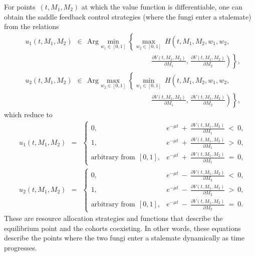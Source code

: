 \documentclass[11pt]{amsart}
\begin{document}
For points~$ (t, M_1, M_2) $ at which the value function is differentiable,
one can obtain the saddle feedback control strategies (where the fungi enter a stalemate) from the relations
$$
\begin{aligned}
& u_1(t, M_1, M_2) \:\: \in \:\: \mathrm{Arg} \min_{w_1 \in [0, 1]}
  \left\{ \max_{w_2 \in [0, 1]} \:
H \left( t, M_1, M_2, w_1, w_2, {}^{{}^{{}^{{}^{{}^{}}}}} \right. \right. \\
& \qquad\qquad\qquad\qquad\qquad\qquad\qquad\qquad\qquad
\left. \left. \frac{\partial V(t, M_1, M_2)}{\partial M_1}, \,
  \frac{\partial V(t, M_1, M_2)}{\partial M_2} \right) \right\}, \\
& u_2(t, M_1, M_2) \:\: \in \:\: \mathrm{Arg} \max_{w_2 \in [0, 1]}
  \left\{ \min_{w_1 \in [0, 1]} \:
H \left( t, M_1, M_2, w_1, w_2, {}^{{}^{{}^{{}^{{}^{}}}}} \right. \right. \\
& \qquad\qquad\qquad\qquad\qquad\qquad\qquad\qquad\qquad
\left. \left. \frac{\partial V(t, M_1, M_2)}{\partial M_1}, \,
  \frac{\partial V(t, M_1, M_2)}{\partial M_2} \right) \right\},
\end{aligned}
$$
which reduce to
\begin{equation}
\begin{aligned}
& u_1(t, M_1, M_2) \:\: = \:\: \begin{cases}
0, & e^{-\mu t} \: + \: \frac{\partial V(t, M_1, M_2)}{\partial M_1}
  \: < \: 0, \\
1, & e^{-\mu t} \: + \: \frac{\partial V(t, M_1, M_2)}{\partial M_1}
  \: > \: 0, \\
\mbox{arbitrary from} \:\: [0, 1], & e^{-\mu t} \: + \: \frac{\partial
  V(t, M_1, M_2)}{\partial M_1} \: = \: 0,
\end{cases} \\
& u_2(t, M_1, M_2) \:\: = \:\: \begin{cases}
0, & e^{-\mu t} \: - \: \frac{\partial V(t, M_1, M_2)}{\partial M_2}
  \: < \: 0, \\
1, & e^{-\mu t} \: - \: \frac{\partial V(t, M_1, M_2)}{\partial M_2}
  \: > \: 0, \\
\mbox{arbitrary from} \:\: [0, 1], & e^{-\mu t} \: - \: \frac{\partial V(t,
M_1, M_2)}{\partial M_2} \: = \: 0.
\end{cases}
\end{aligned}  \label{16}
\end{equation}
These are resource allocation strategies and functions that describe the equilibrium point and the cohorts coexisting. In other words, these equations describe the points where the two fungi enter a stalemate dynamically as time progresses. 
\end{document}
